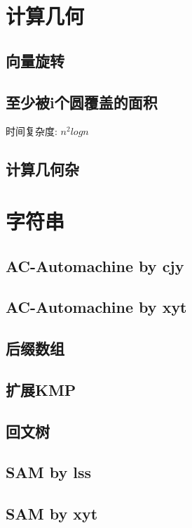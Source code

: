 \documentclass[11pt]{article}
\begin{document}
	\section{计算几何}
		\subsection{向量旋转}
		
		\subsection{至少被i个圆覆盖的面积}
		时间复杂度: $n^2logn$
		
		\subsection{计算几何杂}
		
	\section{字符串}
		\subsection{AC-Automachine by cjy}
		
		\subsection{AC-Automachine by xyt}
		
		\subsection{后缀数组}
		
		\subsection{扩展KMP}
		
		\subsection{回文树}
		
		\subsection{SAM by lss}
		
		\subsection{SAM by xyt}
		
\end{document}
